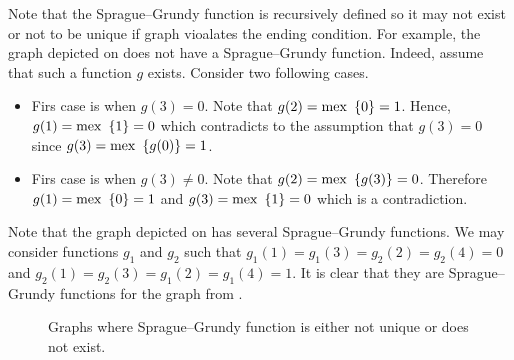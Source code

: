 Note that the Sprague--Grundy function is recursively defined so it may
not exist or not to be unique if graph vioalates the ending condition.
For example, the graph depicted on 
does not have a Sprague--Grundy function.
Indeed, assume that such a function $g$ exists. Consider two following cases.
\begin{itemize}
    \item Firs case is when $g(3) = 0$. Note that $g(2) = \mex \set{0} = 1$.
        Hence, $g(1) = \mex \set{1} = 0$ which contradicts to the assumption
        that $g(3) = 0$ since $g(3) = \mex \set{g(0)} = 1$.
    \item Firs case is when $g(3) \neq 0$. Note that $g(2) = \mex \set{g(3)} = 0$.
        Therefore $g(1) = \mex \set{0} = 1$ and $g(3) = \mex \set{1} = 0$ which
        is a contradiction.
\end{itemize}

Note that the graph depicted on  has
several Sprague--Grundy functions. We may consider functions $g_1$ and $g_2$
such that $g_1(1) = g_1(3) = g_2(2) = g_2(4) = 0$ and
$g_2(1) = g_2(3) = g_1(2) = g_1(4) = 1$. It is clear that they are
Sprague--Grundy functions for the graph from
.

\begin{figure}
    \centering
    \qquad
    \caption{Graphs where Sprague--Grundy function is either not unique or does
      not exist.}
    \vskip 10pt
\end{figure}

